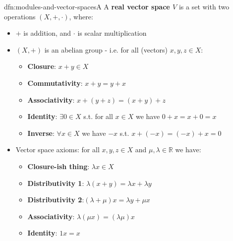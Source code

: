 \documentclass[landscape, 8pt]{extarticle}
\begin{document}
\begin{multicols}{3}
\vspace{-5pt}
\begin{dfn}{dfn:modules-and-vector-spaces}{A}
    \vspace{-5pt}
    A \textbf{real vector space $V$} is a set with two operations $(X, +, \cdot)$, where:
    \vspace{-15pt}
    \begin{itemize}[leftmargin=*]
        \item $+$ is addition, and $\cdot$ is scalar multiplication
        \item $(X, +)$ is an abelian group - i.e. for all (vectors) $x,y,z\in X$:
            \vspace{-5pt}
            \begin{itemize}
                \item \textbf{Closure}: $x + y\in X$
                \item \textbf{Commutativity}: $x + y = y + x$
                \item \textbf{Associativity}: $x + (y + z) = (x + y) + z$
                \item \textbf{Identity}: $\exists 0\in X$ s.t. for all $x\in X$ we have $0 + x = x + 0 = x$
                \item \textbf{Inverse}: $\forall x\in X$ we have $-x$ s.t. $x + (-x) = (-x) + x = 0$
            \end{itemize}
            
            \vspace{-5pt}
            \item Vector space axioms: for all $x,y,z\in X$ and $\mu, \lambda \in \mathbb{R}$ we have:
                \vspace{-5pt}
                \begin{itemize}
                    \item \textbf{Closure-ish thing}: $\lambda x\in X$
                    \item \textbf{Distributivity 1}: $\lambda(x + y) = \lambda x + \lambda y$
                    \item \textbf{Distributivity 2}:$(\lambda + \mu)x = \lambda y + \mu x$
                    \item \textbf{Associativity}: $\lambda (\mu x) = (\lambda \mu) x$
                    \item \textbf{Identity}: $1x = x$
                \end{itemize}
    \end{itemize}
\end{dfn}


\end{multicols}
\end{document}
